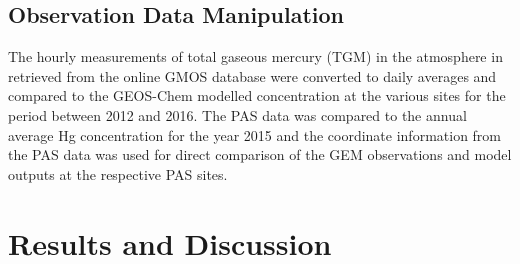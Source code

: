 \subsection{ Observation Data Manipulation}
\begin{flushleft}
The hourly measurements of total gaseous mercury (TGM) in the atmosphere in \nang retrieved from the online GMOS database were converted to daily averages and compared to the GEOS-Chem modelled \hg concentration at the various sites for the period between 2012 and 2016.  The PAS data was compared to the annual average Hg concentration for the year 2015 and the coordinate information from the PAS data was used for direct comparison of the GEM observations and model outputs at the respective PAS sites.
\end{flushleft}
\begin{table}[H]
\label{tab:ASGM_at_GMOS_annual_avs}

\centering
{}

\end{table}

\section{Results and Discussion}
